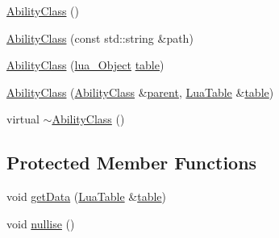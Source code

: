 \begin{DoxyCompactItemize}
\item 
\hyperlink{classZeta_1_1AbilityClass_afbdb2842a741a1ec61d368b7feba0c8b}{Ability\+Class} ()
\item 
\hyperlink{classZeta_1_1AbilityClass_a148bb2b5a878395c3438bb26e8227c51}{Ability\+Class} (const std\+::string \&path)
\item 
\hyperlink{classZeta_1_1AbilityClass_a2e016d5e1a98e26e1804c8b1207d7f07}{Ability\+Class} (\hyperlink{ZetaConfig_8hpp_ae7be32b73848041a60f2412f72bbb221}{lua\+\_\+\+Object} \hyperlink{classZeta_1_1AbilityClass_a58065ca9d19ff9366c09bfc8d81abbac}{table})
\item 
\hyperlink{classZeta_1_1AbilityClass_ad69921fb28e2f0b2caae837c56025913}{Ability\+Class} (\hyperlink{classZeta_1_1AbilityClass}{Ability\+Class} \&\hyperlink{classZeta_1_1AbilityClass_ad862e9ba14d23afb20786a1eeb2ca872}{parent}, \hyperlink{classZeta_1_1LuaTable}{Lua\+Table} \&\hyperlink{classZeta_1_1AbilityClass_a58065ca9d19ff9366c09bfc8d81abbac}{table})
\item 
virtual \hyperlink{classZeta_1_1AbilityClass_a0ae1dbc0026536a2a2b6074885899bd6}{$\sim$\+Ability\+Class} ()
\end{DoxyCompactItemize}
\subsection*{Protected Member Functions}
\begin{DoxyCompactItemize}
\item 
void \hyperlink{classZeta_1_1AbilityClass_a22c6c3ac2ca9c1c9ba048a27bb3fca04}{get\+Data} (\hyperlink{classZeta_1_1LuaTable}{Lua\+Table} \&\hyperlink{classZeta_1_1AbilityClass_a58065ca9d19ff9366c09bfc8d81abbac}{table})
\item 
void \hyperlink{classZeta_1_1AbilityClass_acb06bb30168d885e2aa583296f0e7396}{nullise} ()
\end{DoxyCompactItemize}
